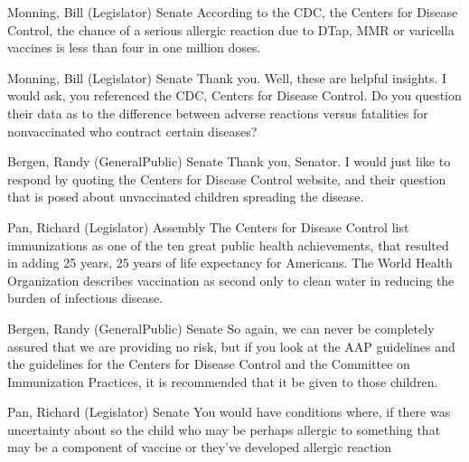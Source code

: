 \begin{result}{36.43010698574717}{Monning, Bill (Legislator) Senate}
According to the CDC, the Centers for Disease Control, the chance of a serious allergic reaction due to DTap, MMR or varicella vaccines is less than four in one million doses.
\end{result}

\begin{result}{18.39225525427141}{Monning, Bill (Legislator) Senate}
Thank you. Well, these are helpful insights. I would ask, you referenced the CDC, Centers for Disease Control. Do you question their data as to the difference between adverse reactions versus fatalities for nonvaccinated who contract certain diseases?
\end{result}

\begin{result}{15.67739188400412}{Bergen, Randy (GeneralPublic) Senate}
Thank you, Senator. I would just like to respond by quoting the Centers for Disease Control website, and their question that is posed about unvaccinated children spreading the disease.
\end{result}

\begin{result}{13.21623776445896}{Pan, Richard (Legislator) Assembly}
The Centers for Disease Control list immunizations as one of the ten great public health achievements, that resulted in adding 25 years, 25 years of life expectancy for Americans. The World Health Organization describes vaccination as second only to clean water in reducing the burden of infectious disease.
\end{result}

\begin{result}{13.085169490229754}{Bergen, Randy (GeneralPublic) Senate}
So again, we can never be completely assured that we are providing no risk, but if you look at the AAP guidelines and the guidelines for the Centers for Disease Control and the Committee on Immunization Practices, it is recommended that it be given to those children.
\end{result}

\begin{result}{12.740299849925432}{Pan, Richard (Legislator) Senate}
You would have conditions where, if there was uncertainty about so the child who may be perhaps allergic to something that may be a component of vaccine or they've developed allergic reaction
\end{result}


